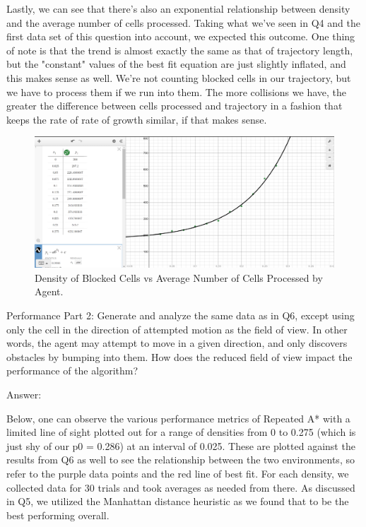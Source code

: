 \documentclass{homeworg}
\begin{document}
Lastly, we can see that there's also an exponential relationship between density and the average number of cells processed. Taking what we've seen in Q4 and the first data set of this question into account, we expected this outcome. One thing of note is that the trend is almost exactly the same as that of trajectory length, but the "constant" values of the best fit equation are just slightly inflated, and this makes sense as well. We're not counting blocked cells in our trajectory, but we have to process them if we run into them. The more collisions we have, the greater the difference between cells processed and trajectory in a fashion that keeps the rate of rate of growth similar, if that makes sense.

\begin{figure}[h]
  	\centering
  	\includegraphics*[scale=0.3]{Q6 Density vs Avg Number of Cells Processed.png}
	\caption{Density of Blocked Cells vs Average Number of Cells Processed by Agent.}
	\label{fig:example}
\end{figure}

\newpage
\exercise*
Performance Part 2: Generate and analyze the same data as in Q6, except using only the cell in the direction of attempted motion as the field of view. In other words, the agent may attempt to move in a given direction, and only discovers obstacles by bumping into them. How does the reduced field of view impact the performance of the algorithm?

Answer:

Below, one can observe the various performance metrics of Repeated A* with a limited line of sight plotted out for a range of densities from 0 to 0.275 (which is just shy of our p0 = 0.286) at an interval of 0.025. These are plotted against the results from Q6 as well to see the relationship between the two environments, so refer to the purple data points and the red line of best fit. For each density, we collected data for 30 trials and took averages as needed from there. As discussed in Q5, we utilized the Manhattan distance heuristic as we found that to be the best performing overall.
\end{document}
